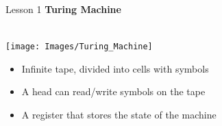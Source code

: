 \documentclass[aspectratio=1610]{beamer}
\begin{document}
\begin{frame}{Lesson 1}{}
{\Large\textbf{{Turing Machine}}}\\~\\
\begin{minipage}{0.57\textwidth}
\texttt{[image: Images/Turing\_Machine]}
\end{minipage}
\Large
\begin{minipage}{0.42\textwidth}
    \begin{itemize}
      \item Infinite tape, divided into cells with symbols
      \item A head can read/write symbols on the tape
      \item A register that stores the state of the machine
    \end{itemize}
  \end{minipage}
\end{frame}
\end{document}
